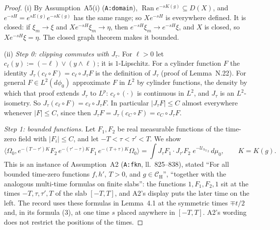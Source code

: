 \documentclass[11pt,a4paper]{article}
\newcommand{\CH}{\mathcal{C}_{\mathrm H}}
\newcommand{\Om}{\Omega}
\newcommand{\ip}[2]{\langle #1,#2\rangle}
\DeclareMathOperator{\Ran}{Ran}
\newcommand{\Uc}{\mathcal U}
\newcommand{\dphi}{d\phi_0}
\theoremstyle{plain}
\theoremstyle{definition}
\begin{document}
\begin{proof}
(i) By Assumption~A5(i) (\texttt{A:domain}), $\Ran e^{-sK(g)}\subseteq D(X)$, and
$e^{-sH}=e^{sE(g)}e^{-sK(g)}$ has the same range; so $Xe^{-sH}$ is everywhere defined.  It is
closed: if $\xi_m\to\xi$ and $Xe^{-sH}\xi_m\to\eta$, then $e^{-sH}\xi_m\to e^{-sH}\xi$, and $X$
is closed, so $Xe^{-sH}\xi=\eta$.  The closed graph theorem makes it bounded.

(ii) \emph{Step 0: clipping commutes with $J_\tau$.}  For $\ell>0$ let
$c_\ell(y):=(-\ell)\vee(y\wedge\ell)$; it is $1$-Lipschitz.  For a cylinder function $F$ the
identity $J_\tau(c_\ell\circ F)=c_\ell\circ J_\tau F$ is the definition of $J_\tau$ (proof of
Lemma~N.22).  For general $F\in L^2(\dphi)$ approximate $F$ in $L^2$ by cylinder functions, the
density by which that proof extends $J_\tau$ to $L^p$: $c_\ell\circ(\cdot)$ is continuous in
$L^2$, and $J_\tau$ is an $L^2$-isometry.  So $J_\tau(c_\ell\circ F)=c_\ell\circ J_\tau F$.  In
particular $|J_\tau F|\le C$ almost everywhere whenever $|F|\le C$, since then
$J_\tau F=J_\tau(c_C\circ F)=c_C\circ J_\tau F$.

\emph{Step 1: bounded functions.}  Let $F_1,F_2$ be real measurable functions of the time-zero
field with $|F_i|\le C$, and let $-T<\tau<\tau'<T$.  We show
\begin{equation}
 \ip{\Om_0}{e^{-(T-\tau')K}F_2\,e^{-(\tau'-\tau)K}F_1\,e^{-(T+\tau)K}\Om_0}
 =\int J_\tau F_1\cdot J_{\tau'}F_2\;e^{-\Uc_{h_{T,g}}}\,d\mu_0 ,\qquad K=K(g).
 \label{eq:fknasym}
\end{equation}
This is an instance of Assumption~A2 (\texttt{A:fkn}, ll.~825--838), stated ``For all bounded
time-zero functions $f,h'$, $T>0$, and $g\in\CH$'', ``together with the analogous multi-time
formulas on finite slabs'': the functions $1,F_1,F_2,1$ sit at the times $-T,\tau,\tau',T$ of the
slab $[-T,T]$, and A2's display puts the later time on the left.  The record uses these formulas
in Lemma~4.1 at the symmetric times $\mp t/2$ and, in its formula (3), at one time $s$ placed
anywhere in $[-T,T]$.  A2's wording does not restrict the positions of the times.


\end{proof}
\end{document}
